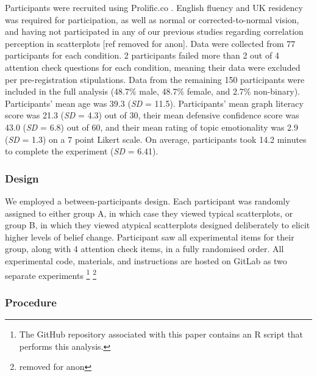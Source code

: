 \documentclass[manuscript,screen,review]{acmart}
\begin{document}
Participants were recruited using Prolific.co \citep{prolific}. English
fluency and UK residency was required for participation, as well as
normal or corrected-to-normal vision, and having not participated in any
of our previous studies regarding correlation perception in scatterplots
{[}ref removed for anon{]}. Data were collected from 77 participants for
each condition. 2 participants failed more than 2 out of 4 attention
check questions for each condition, meaning their data were excluded per
pre-registration stipulations. Data from the remaining 150 participants
were included in the full analysis (48.7\% male, 48.7\% female, and
2.7\% non-binary). Participants' mean age was 39.3 (\emph{SD} = 11.5).
Participants' mean graph literacy score was 21.3 (\emph{SD} = 4.3) out
of 30, their mean defensive confidence score was 43.0 (\emph{SD} = 6.8)
out of 60, and their mean rating of topic emotionality was 2.9
(\emph{SD} = 1.3) on a 7 point Likert scale. On average, participants
took 14.2 minutes to complete the experiment (\emph{SD} = 6.41).

\subsubsection{Design}\label{sec-design-main}

We employed a between-participants design. Each participant was randomly
assigned to either group A, in which case they viewed typical
scatterplots, or group B, in which they viewed atypical scatterplots
designed deliberately to elicit higher levels of belief change.
Participant saw all experimental items for their group, along with 4
attention check items, in a fully randomised order. All experimental
code, materials, and instructions are hosted on GitLab as two separate
experiments \footnote{The GitHub repository associated with this paper
  contains an R script that performs this analysis.} \footnote{removed
  for anon}

\subsubsection{Procedure}\label{sec-procedure-main}
\end{document}
